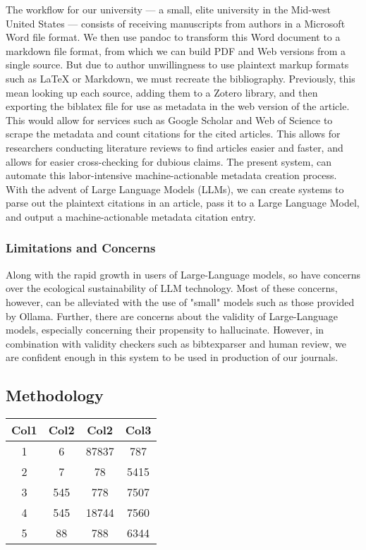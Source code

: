 \documentclass{article}
\begin{document}
The workflow for our university --- a small, elite university in the
Mid-west United States --- consists of receiving manuscripts from
authors in a Microsoft Word file format. We then use pandoc \cite{PandocIndex}
to transform this Word document to a markdown file format, from which we can
build PDF and Web versions from a single source. But due to author unwillingness 
to use plaintext markup formats such as LaTeX or Markdown, we must recreate the 
bibliography. Previously, this mean looking up each source, adding them to a Zotero\cite{ZoteroYourPersonal}
library, and then exporting the biblatex file for use as metadata in the web version of the article.
This would allow for services such as Google Scholar and Web of Science to scrape the metadata and 
count citations for the cited articles. This allows for researchers conducting literature reviews to 
find articles easier and faster, and allows for easier cross-checking for dubious claims. The present system, 
can automate this labor-intensive machine-actionable metadata creation process. 
With the advent of Large Language Models (LLMs), we can create systems to parse out the plaintext citations 
in an article, pass it to a Large Language Model, and output a machine-actionable metadata citation entry.

\subsubsection{Limitations and Concerns}

Along with the rapid growth in users of Large-Language models, so have concerns over 
the ecological sustainability of LLM technology.\cite{dingSustainableLLMServing2024} \cite{chienReducingCarbonImpact2023}
Most of these concerns, however, can be alleviated with the use of "small" models such as 
those provided by Ollama. Further, there are concerns about the validity of Large-Language models,
especially concerning their propensity to hallucinate. However, in combination with validity checkers 
such as bibtexparser and human review, we are confident enough in this system to be used in 
production of our journals.

\subsection{Methodology}\label{methodology}



\begin{center}
\begin{tabular}{||c c c c||} 
 \hline
 Col1 & Col2 & Col2 & Col3 \\ [0.5ex] 
 \hline\hline
 1 & 6 & 87837 & 787 \\ 
 \hline
 2 & 7 & 78 & 5415 \\
 \hline
 3 & 545 & 778 & 7507 \\
 \hline
 4 & 545 & 18744 & 7560 \\
 \hline
 5 & 88 & 788 & 6344 \\ [1ex] 
 \hline
\end{tabular}
\end{center}
\end{document}

